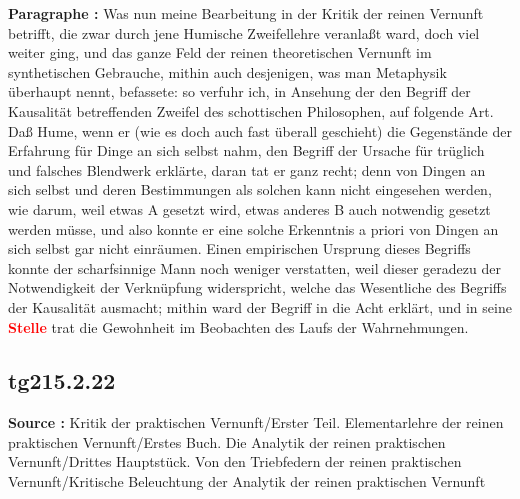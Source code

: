 \documentclass[a4paper,12pt,twoside]{book}
\newcommand{\match}[1]{\textcolor{red}{\textbf{#1}}}
\begin{document}
	\noindent\textbf{Paragraphe : }Was nun meine Bearbeitung in der Kritik der reinen Vernunft betrifft, die zwar durch jene Humische Zweifellehre veranlaßt ward, doch viel weiter ging, und das ganze Feld der reinen theoretischen Vernunft im synthetischen Gebrauche, mithin auch desjenigen, was man Metaphysik überhaupt nennt, befassete: so verfuhr ich, in Ansehung der den Begriff der Kausalität betreffenden Zweifel des schottischen Philosophen, auf folgende Art. Daß Hume, wenn er (wie es doch auch fast überall geschieht) die Gegenstände der Erfahrung für Dinge an sich selbst nahm, den Begriff der Ursache für trüglich und falsches Blendwerk erklärte, daran tat er ganz recht; denn von Dingen an sich selbst und deren Bestimmungen als solchen kann nicht eingesehen werden, wie darum, weil etwas A gesetzt wird, etwas anderes B auch notwendig gesetzt werden müsse, und also konnte er eine solche Erkenntnis a priori von Dingen an sich selbst gar nicht einräumen. Einen empirischen Ursprung dieses Begriffs konnte der scharfsinnige Mann noch weniger verstatten, weil dieser geradezu der Notwendigkeit der Verknüpfung widerspricht, welche das Wesentliche des Begriffs der Kausalität ausmacht; mithin ward der Begriff in die Acht erklärt, und in seine \match{Stelle}  trat die Gewohnheit im Beobachten des Laufs der Wahrnehmungen. 
	
	\subsection*{tg215.2.22} 
	\textbf{Source : }Kritik der praktischen Vernunft/Erster Teil. Elementarlehre der reinen praktischen Vernunft/Erstes Buch. Die Analytik der reinen praktischen Vernunft/Drittes Hauptstück. Von den Triebfedern der reinen praktischen Vernunft/Kritische Beleuchtung der Analytik der reinen praktischen Vernunft\\  
	
\end{document}
